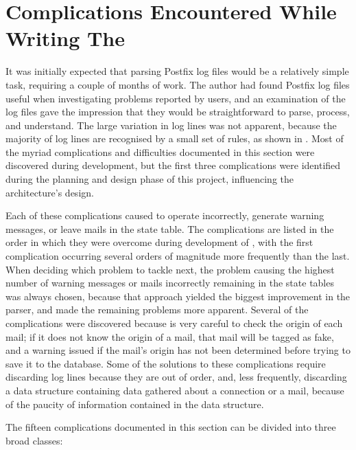 \section{Complications Encountered While Writing The \parsernamelong{}}

\label{complications}

It was initially expected that parsing Postfix log files would be a
relatively simple task, requiring a couple of months of work.  The author
had found Postfix log files useful when investigating problems reported by
users, and an examination of the log files gave the impression that they
would be straightforward to parse, process, and understand.  The large
variation in log lines was not apparent, because the majority of log lines
are recognised by a small set of rules, as shown in .  Most of the myriad complications and difficulties documented in
this section were discovered during \parsernames{} development, but the
first three complications were identified during the planning and design
phase of this project, influencing the architecture's design.

Each of these complications caused \parsername{} to operate incorrectly,
generate warning messages, or leave mails in the state table.  The
complications are listed in the order in which they were overcome during
development of \parsername{}, with the first complication occurring several
orders of magnitude more frequently than the last.  When deciding which
problem to tackle next, the problem causing the highest number of warning
messages or mails incorrectly remaining in the state tables was always
chosen, because that approach yielded the biggest improvement in the
parser, and made the remaining problems more apparent.  Several of the
complications were discovered because \parsername{} is very careful to
check the origin of each mail; if it does not know the origin of a mail,
that mail will be tagged as fake, and a warning issued if the mail's origin
has not been determined before trying to save it to the database.  Some of
the solutions to these complications require discarding log lines because
they are out of order, and, less frequently, discarding a data structure
containing data gathered about a connection or a mail, because of the
paucity of information contained in the data structure.

The fifteen complications documented in this section can be divided into
three broad classes:

